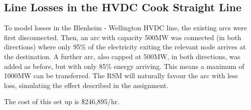 \documentclass[11pt]{article}
\begin{document}
\subsection*{Line Losses in the HVDC Cook Straight Line}
To model losses in the Blenheim - Wellington HVDC line, the existing arcs were first disconnected. Then, an arc with capacity 500MW was connected (in both directions) where only 95\% of the electricity exiting the relevant node arrives at the destination. A further arc, also capped at 500MW, in both directions, was added as before, but with only 85\% energy arriving. This means a maximum of 1000MW can be transferred. The RSM will naturally favour the arc with less loss, simulating the effect described in the assignment. 

The cost of this set up is \$246,895/hr. 
\end{document}
